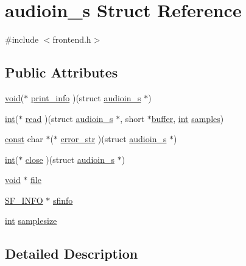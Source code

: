 \hypertarget{structaudioin__s}{}\section{audioin\+\_\+s Struct Reference}
\label{structaudioin__s}


{\ttfamily \#include $<$frontend.\+h$>$}

\subsection*{Public Attributes}
\begin{DoxyCompactItemize}
\item 
\hyperlink{sound_8c_ae35f5844602719cf66324f4de2a658b3}{void}($\ast$ \hyperlink{structaudioin__s_ad7d08417cdbdec93ace36da2b25e48fd}{print\+\_\+info} )(struct \hyperlink{structaudioin__s}{audioin\+\_\+s} $\ast$)
\item 
\hyperlink{xmltok_8h_a5a0d4a5641ce434f1d23533f2b2e6653}{int}($\ast$ \hyperlink{structaudioin__s_aebab609975602745270208c70378fb18}{read} )(struct \hyperlink{structaudioin__s}{audioin\+\_\+s} $\ast$, short $\ast$\hyperlink{structbuffer}{buffer}, \hyperlink{xmltok_8h_a5a0d4a5641ce434f1d23533f2b2e6653}{int} \hyperlink{test__w__saw8_8c_a54185623a5a093f671a73e5fba6197a1}{samples})
\item 
\hyperlink{getopt1_8c_a2c212835823e3c54a8ab6d95c652660e}{const} char $\ast$($\ast$ \hyperlink{structaudioin__s_a81096ec686290698e3edb9028df300da}{error\+\_\+str} )(struct \hyperlink{structaudioin__s}{audioin\+\_\+s} $\ast$)
\item 
\hyperlink{xmltok_8h_a5a0d4a5641ce434f1d23533f2b2e6653}{int}($\ast$ \hyperlink{structaudioin__s_ac024cfe6c47d65137cad2acc542e4c38}{close} )(struct \hyperlink{structaudioin__s}{audioin\+\_\+s} $\ast$)
\item 
\hyperlink{sound_8c_ae35f5844602719cf66324f4de2a658b3}{void} $\ast$ \hyperlink{structaudioin__s_aa941ab3f8967121ffa7310cc4fb99c2a}{file}
\item 
\hyperlink{struct_s_f___i_n_f_o}{S\+F\+\_\+\+I\+N\+FO} $\ast$ \hyperlink{structaudioin__s_af101968f364ce87662919aa7e1e63c78}{sfinfo}
\item 
\hyperlink{xmltok_8h_a5a0d4a5641ce434f1d23533f2b2e6653}{int} \hyperlink{structaudioin__s_a47ed9fcb24c3f7e390d0383d974fdef4}{samplesize}
\end{DoxyCompactItemize}


\subsection{Detailed Description}


